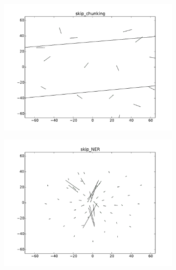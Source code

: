 \begin{figure}
\caption{Updated vs. no-updated word representations for POS-tagging and chunking using skip-gram}
\centering
\begin{subfigure}[b]{0.48\textwidth}
	\centering
    \includegraphics[width=\textwidth]{plots/vectorField/Lizhen/scaled/skip_chunking}
	\label{fig:skipChu}
\end{subfigure}
\begin{subfigure}[b]{0.48\textwidth}
	\centering
    \includegraphics[width=\textwidth]{plots/vectorField/Lizhen/skip_NER}    	
	\label{fig:skippos}
\end{subfigure}

\label{fig:vectorfield}
\end{figure}

